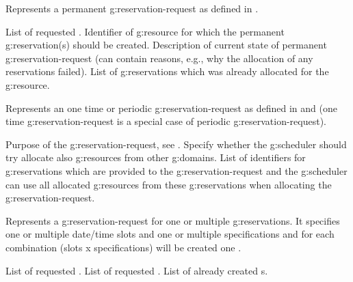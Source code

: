\begin{Api}
Represents a permanent \gls{g:reservation-request} as defined in .
\begin{ApiClassAttributes}
 List of requested .
 Identifier of \gls{g:resource} for which the permanent \gls{g:reservation}(s) should be created. 
 Description of current state of permanent \gls{g:reservation-request} (can contain reasons, e.g., why the allocation of any reservations failed).
 List of \glspl{g:reservation} which was already allocated for the \gls{g:resource}.
\end{ApiClassAttributes}

Represents an one time or periodic \gls{g:reservation-request} as defined in  and  (one time \gls{g:reservation-request} is a special case of periodic \gls{g:reservation-request}).
\begin{ApiClassAttributes}
 Purpose of the \gls{g:reservation-request}, see .
 Specify whether the \gls{g:scheduler} should try allocate also \glspl{g:resource} from other \glspl{g:domain}.
 List of identifiers for \glspl{g:reservation} which are provided to the \gls{g:reservation-request} and the \gls{g:scheduler} can use all allocated \glspl{g:resource} from these \glspl{g:reservation} when allocating the \gls{g:reservation-request}.
\end{ApiClassAttributes}

Represents a \gls{g:reservation-request} for one or multiple \glspl{g:reservation}. It specifies one or multiple date/time slots and one or multiple specifications and for each combination (slots x specifications) will be created one .
\begin{ApiClassAttributes}
 List of requested .
 List of requested .
 List of already created s.
\end{ApiClassAttributes}


\end{Api}
